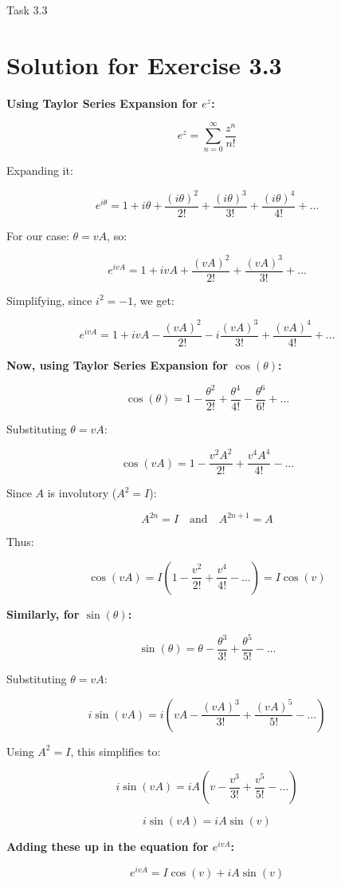 \documentclass[aspectratio=169]{beamer}
\begin{document}
\begin{frame}[fragile]{Task 3.3}
\section*{Solution for Exercise 3.3}

{\tiny
\textbf{Using Taylor Series Expansion for \(e^z\):}

\[
e^z = \sum_{n=0}^\infty \frac{z^n}{n!}
\]

Expanding it:

\[
e^{i\theta} = 1 + i\theta + \frac{(i\theta)^2}{2!} + \frac{(i\theta)^3}{3!} + \frac{(i\theta)^4}{4!} + \dots
\]

For our case: \(\theta = vA\), so:

\[
e^{i v A} = 1 + i v A + \frac{(vA)^2}{2!} + \frac{(vA)^3}{3!} + \dots
\]

Simplifying, since \(i^2 = -1\), we get:

\[
e^{i v A} = 1 + i v A - \frac{(vA)^2}{2!} - i \frac{(vA)^3}{3!} + \frac{(vA)^4}{4!} + \dots
\]

\textbf{Now, using Taylor Series Expansion for \(\cos(\theta)\):}

\[
\cos(\theta) = 1 - \frac{\theta^2}{2!} + \frac{\theta^4}{4!} - \frac{\theta^6}{6!} + \dots
\]

Substituting \(\theta = vA\):

\[
\cos(vA) = 1 - \frac{v^2 A^2}{2!} + \frac{v^4 A^4}{4!} - \dots
\]
}
\end{frame}
\begin{frame}

{\tiny
Since \(A\) is involutory (\(A^2 = I\)):

\[
A^{2n} = I \quad \text{and} \quad A^{2n+1} = A
\]

Thus:

\[
\cos(vA) = I \left(1 - \frac{v^2}{2!} + \frac{v^4}{4!} - \dots\right) = I \cos(v)
\]

\textbf{Similarly, for \(\sin(\theta)\):}

\[
\sin(\theta) = \theta - \frac{\theta^3}{3!} + \frac{\theta^5}{5!} - \dots
\]

Substituting \(\theta = vA\):

\[
i\sin(vA) = i\left(vA - \frac{(vA)^3}{3!} + \frac{(vA)^5}{5!} - \dots\right)
\]

Using \(A^2 = I\), this simplifies to:

\[
i \sin(vA) = i A \left(v - \frac{v^3}{3!} + \frac{v^5}{5!} - \dots\right)
\]

\[
i \sin(vA) = i A \sin(v)
\]

\textbf{Adding these up in the equation for \(e^{i v A}\):}

\[
e^{i v A} = I \cos(v) + i A \sin(v)
\]
}
\end{frame}
\end{document}
